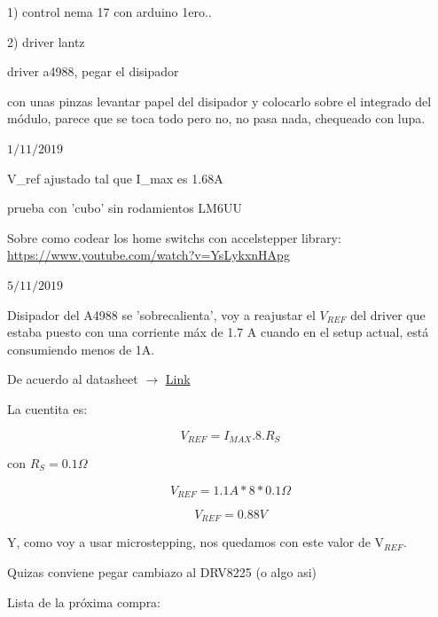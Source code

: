\documentclass[12pt,dvipsnames]{exam}
\begin{document}
1) control nema 17 con arduino 1ero..

2) driver lantz


driver a4988, pegar el disipador

con unas pinzas levantar papel del disipador y colocarlo sobre el integrado del módulo, parece que se toca todo pero no, no pasa nada, chequeado con lupa.



\hrulefill

$1/11/2019$

V\_ref ajustado tal que I\_max es 1.68A

prueba con 'cubo' sin rodamientos LM6UU

Sobre como codear los home switchs con accelstepper library: \url{https://www.youtube.com/watch?v=YsLykxnHApg}





\hrulefill

$5/11/2019$

Disipador del A4988 se 'sobrecalienta', voy a reajustar el $V_{REF}$ del driver que estaba puesto con una corriente máx de 1.7 A cuando en el setup actual, está consumiendo menos de 1A.

De acuerdo al datasheet $\xrightarrow{}$ \href{https://www.pololu.com/file/0J450/a4988_DMOS_microstepping_driver_with_translator.pdf}{Link}

La cuentita es:

\begin{equation}
V_{REF} = I_{MAX} . 8 . R_{S}
\end{equation}

con $R_{S} = 0.1 \Omega$

\begin{equation}
V_{REF} = 1.1 A * 8 * 0.1 \Omega 
\end{equation}


\begin{equation}
V_{REF} = 0.88 V 
\end{equation}


Y, como voy a usar microstepping, nos quedamos con este valor de V$_{REF}$.


Quizas conviene pegar cambiazo al DRV8225 (o algo asi)

Lista de la próxima compra:
\end{document}
